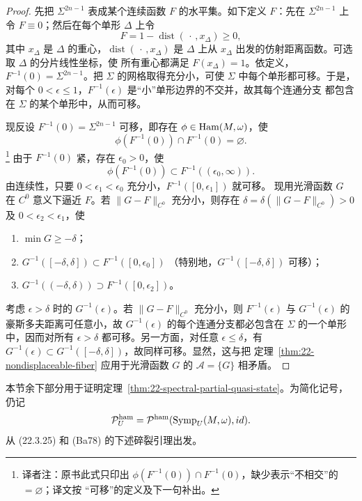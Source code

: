 \begin{proof}
先把 $\Sigma^{2n-1}$ 表成某个连续函数 $F$ 的水平集。如下定义 $F$：先在
$\Sigma^{2n-1}$ 上令 $F\equiv0$；然后在每个单形 $\Delta$ 上令
\[
 F=1-\operatorname{dist}(\,\cdot\,,x_\Delta)\geq0,
\]
其中 $x_\Delta$ 是 $\Delta$ 的重心，$\operatorname{dist}(\,\cdot\,,x_\Delta)$ 是
$\Delta$ 上从 $x_\Delta$ 出发的仿射距离函数。可选取 $\Delta$ 的分片线性坐标，使
所有重心都满足 $F(x_\Delta)=1$。依定义，$F^{-1}(0)=\Sigma^{2n-1}$。把 $\Sigma$
的网格取得充分小，可使 $\Sigma$ 中每个单形都可移。于是，对每个
$0<\epsilon\leq1$，$F^{-1}(\epsilon)$ 是“小”单形边界的不交并，故其每个连通分支
都包含在 $\Sigma$ 的某个单形中，从而可移。

现反设 $F^{-1}(0)=\Sigma^{2n-1}$ 可移，即存在 $\phi\in\operatorname{Ham}(M,\omega)$，使
\[
 \phi(F^{-1}(0))\cap F^{-1}(0)=\varnothing.
\]
\footnote{译者注：原书此式只印出
$\phi(F^{-1}(0))\cap F^{-1}(0)$，缺少表示“不相交”的 $=\varnothing$；译文按
“可移”的定义及下一句补出。}
由于 $F^{-1}(0)$ 紧，存在 $\epsilon_0>0$，使
\[
 \phi(F^{-1}(0))\subset F^{-1}((\epsilon_0,\infty)).
\]
由连续性，只要 $0<\epsilon_1<\epsilon_0$ 充分小，$F^{-1}([0,\epsilon_1])$ 就可移。
现用光滑函数 $G$ 在 $C^0$ 意义下逼近 $F$。若
$\lVert G-F\rVert_{C^0}$ 充分小，则存在
$\delta=\delta(\lVert G-F\rVert_{C^0})>0$ 及 $0<\epsilon_2<\epsilon_1$，使
\begin{enumerate}[label=(\arabic*)]
\item $\min G\geq-\delta$；
\item $G^{-1}([-\delta,\delta])\subset F^{-1}([0,\epsilon_0])$
      （特别地，$G^{-1}([-\delta,\delta])$ 可移）；
\item $G^{-1}((-\delta,\delta))\supset F^{-1}([0,\epsilon_2])$。
\end{enumerate}

考虑 $\epsilon>\delta$ 时的 $G^{-1}(\epsilon)$。若
$\lVert G-F\rVert_{C^0}$ 充分小，则 $F^{-1}(\epsilon)$ 与 $G^{-1}(\epsilon)$ 的
豪斯多夫距离可任意小，故 $G^{-1}(\epsilon)$ 的每个连通分支都必包含在
$\Sigma$ 的一个单形中，因而对所有 $\epsilon>\delta$ 都可移。另一方面，对任意
$\epsilon\leq\delta$，有
$G^{-1}(\epsilon)\subset G^{-1}([-\delta,\delta])$，故同样可移。显然，这与把
定理~\ref{thm:22-nondisplaceable-fiber} 应用于光滑函数 $G$ 的
$\mathcal A=\{G\}$ 相矛盾。
\end{proof}

本节余下部分用于证明定理~\ref{thm:22-spectral-partial-quasi-state}。为简化记号，仍记
\[
 \mathcal P_U^{\mathrm{ham}}
 =\mathcal P^{\mathrm{ham}}(\operatorname{Symp}_U(M,\omega),id).
\]
从 (22.3.25) 和\personBanyaga{} (Ba78) 的下述碎裂引理出发。

